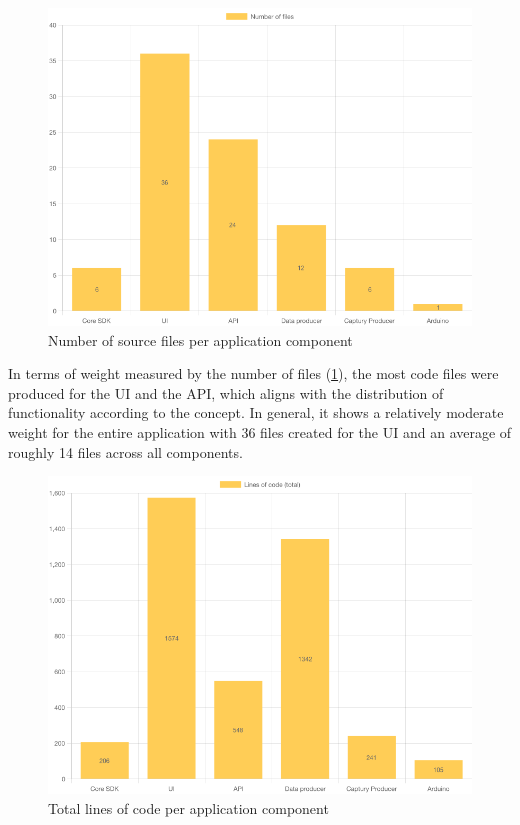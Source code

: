 \begin{figure}[h]
\centering
\includegraphics[scale=0.5]{04_Artefakte/01_Abbildungen/code-stats-filecount}
\caption[File count]{Number of source files per application component\protect}
\label{fig:fileCount}
\end{figure}

In terms of weight measured by the number of files (\ref{fig:fileCount}), the most code files were produced for the \ac{UI} and the \ac{API}, which aligns with the distribution of functionality according to the concept. In general, it shows a relatively moderate weight for the entire application with 36 files created for the \ac{UI} and an average of roughly 14 files across all components.

\begin{figure}[h]
\centering
\includegraphics[scale=0.5]{04_Artefakte/01_Abbildungen/code-stats-loc-total}
\caption[Lines of code (total)]{Total lines of code per application component\protect}
\label{fig:linesOfCodeTotal}
\end{figure}

